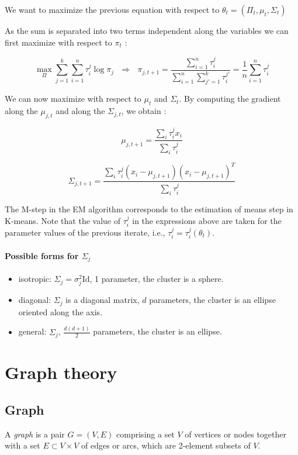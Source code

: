\documentclass[12pt]{report}
\begin{document}
We want to maximize the previous equation with respect to $\theta_t=(\Pi_t,\mu_t,\Sigma_t)$

As the sum is separated into two terms independent along the variables we can first maximize with respect to $\pi_t$ :

$$\max_{\Pi}\sum_{j=1}^{k}\sum_{i=1}^{n}
\tau_{i}^{j} \log\pi_{j}\ \ \ \Rightarrow\ \ \ \pi_{j,t+1}=\dfrac{\sum_{i=1}^{n}
\tau_{i}^{j} }{\sum_{i=1}^{n}\sum_{j'=1}^{k}
\tau_{i}^{j'} }=\dfrac{1}{n}\sum_{i=1}^{n}
\tau_{i}^{j} $$

We can now maximize with respect to $\mu_t$ and $\Sigma_t$. By computing the gradient along the $\mu_{j,t}$ and along the $\Sigma_{j,t}$, we obtain :

$$ \mu_{j,t+1}=\frac{\sum_i \tau_i^j x_i}{\sum_i \tau_i^j}$$

$$\Sigma_{j,t+1}=\frac{\sum_i
  \tau_i^j (x_i-\mu_{j,t+1})(x_i-\mu_{j,t+1})^T}{\sum_i \tau_i^j }$$

The M-step in the EM algorithm  corresponds  to the estimation of means step in K-means. Note that the value of $\tau_i^j$ in the expressions above are taken for the parameter values of the previous iterate, i.e., $ \tau_i^j =  \tau_i^j(\theta_t)$.

\paragraph{Possible forms for $\Sigma_{j}$}
\begin{itemize}
\item isotropic: $\Sigma_{j}=\sigma^{2}_{j}
\mathrm{Id}$, 1 parameter, the cluster is a sphere.
\item diagonal: $\Sigma_{j}$ is a diagonal matrix, $d$ parameters, the cluster is an ellipse oriented along  the axis.
\item general: $\Sigma_{j}$, $\frac{d(d+1)}{2}$ parameters, the cluster is an ellipse.
\end{itemize}

\section{Graph theory}

\subsection{Graph}

\begin{definition}[graph] 
A \emph{graph} is a pair $G = (V, E)$ comprising a set $V$ of vertices or nodes together with a set $E\subset V\times V$ of edges or arcs, which are 2-element subsets of $V$. 

\end{definition}
\end{document}
